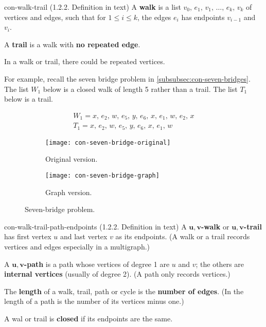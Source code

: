 \documentclass[../src/handouts/main.tex]{subfiles}
\begin{document}
\begin{definition}{}{con-walk-trail}
  (1.2.2. Definition in text)
  A \textbf{walk} is a list $v_0,\, e_1,\, v_1,\, \ldots,\, e_k,\, v_k$ of vertices and edges, such that for $1 \leq i \leq k$, the edges $e_i$ has endpoints $v_{i-1}$ and $v_i$.

  A \textbf{trail} is a walk with \textbf{no repeated edge}.
\end{definition}

In a walk or trail, there could be repeated vertices.

For example, recall the seven bridge problem in \cref{subsubsec:con-seven-bridges}. The list $W_1$ below is a closed walk of length 5 rather than a trail. The list $T_1$ below is a trail.

\begin{align*}
  W_1 = x,\, e_2,\, w,\, e_5,\, y,\, e_6,\, x,\, e_1,\, w,\, e_2,\, x \\
  T_1 = x,\, e_2,\, w,\, e_5,\, y,\, e_6,\, x,\, e_1,\, w
\end{align*}

\begin{figure}[ht]
  \centering
  \begin{subfigure}{0.35\textwidth}
    \centering
    \texttt{[image: con-seven-bridge-original]}
    \caption{Original version.}
  \end{subfigure}
  \hfil
  \begin{subfigure}{0.25\textwidth}
    \centering
    \texttt{[image: con-seven-bridge-graph]}
    \caption{Graph version.}
  \end{subfigure}
  \caption{Seven-bridge problem.}
\end{figure}

\begin{definition}{}{con-walk-trail-path-endpoints}
  (1.2.2. Definition in text)
  A \textbf{$\bm{u,v}$-walk} or \textbf{$\bm{u,v}$-trail} has first vertex $u$ and last vertex $v$ as its endpoints.
  (A walk or a trail records vertices and edges especially in a multigraph.)

  A \textbf{$\bm{u,v}$-path} is a path whose vertices of degree 1 are $u$ and $v$; the others are \textbf{internal vertices} (usually of degree 2). (A path only records vertices.)

  The \textbf{length} of a walk, trail, path or cycle is the \textbf{number of edges}. (In the length of a path is the number of its vertices minus one.)

  A wal or trail is \textbf{closed} if its endpoints are the same.
\end{definition}
\end{document}

